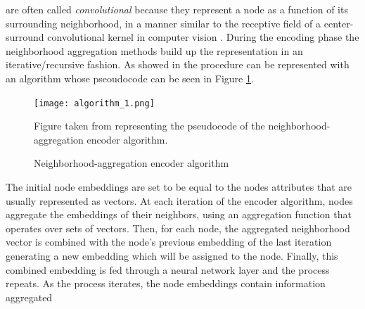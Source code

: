 are often called \textit{convolutional} because they represent a node as a function of its surrounding neighborhood, in a manner similar to the receptive field of a center-surround convolutional kernel in computer vision \cite{kipf_semi_supervised}. During the encoding phase the neighborhood aggregation methods build up the representation in an iterative/recursive fashion. As showed in \cite{representationLearning} the procedure can be represented with an algorithm whose pseoudocode can be seen  in Figure \ref{fig:algorithm_1}.
\begin{figure}
\centering
\texttt{[image: algorithm\_1.png]}
\caption{Neighborhood-aggregation encoder algorithm}
Figure taken from \cite{representationLearning} representing the pseudocode of the neighborhood-aggregation encoder algorithm.
\label{fig:algorithm_1}
\end{figure}
The initial node embeddings are set to be equal to the nodes attributes that are usually represented as vectors. At each iteration of the encoder algorithm, nodes aggregate the
embeddings of their neighbors, using an aggregation function that operates over sets of vectors. Then, for each node, the  aggregated neighborhood vector is combined with the node's previous embedding of the last iteration generating a new embedding which will be assigned to the node. Finally, this combined embedding is fed through a neural
network layer and the process repeats. As the process iterates, the node embeddings contain information aggregated
